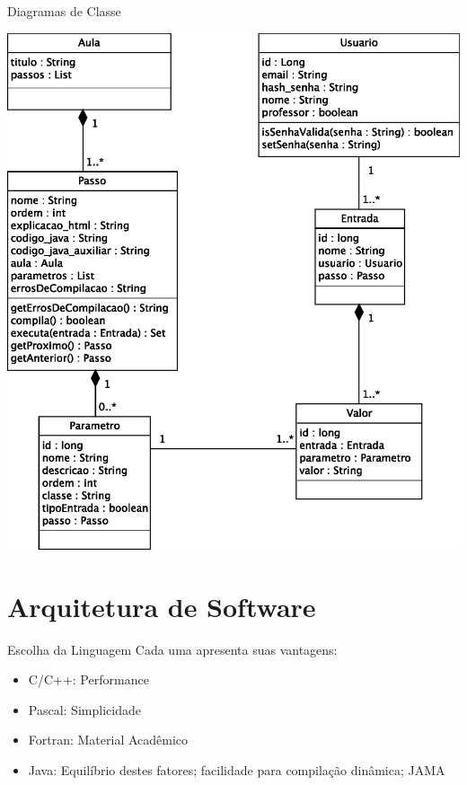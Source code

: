 \documentclass{beamer}
\begin{document}
\begin{frame}{Diagramas de Classe}
	\begin{center}
		\includegraphics[scale=0.4]{../trabalho_full/classes.eps}
	\end{center}
\end{frame}

\section{Arquitetura de Software}

\begin{frame}{Escolha da Linguagem}
	Cada uma apresenta suas vantagens:
	\begin{itemize}
		\item C/C++: Performance
		\item Pascal: Simplicidade
		\item Fortran: Material Acadêmico
		\item Java: Equilíbrio destes fatores; facilidade para compilação dinâmica; JAMA
	\end{itemize}
\end{frame}
\end{document}
